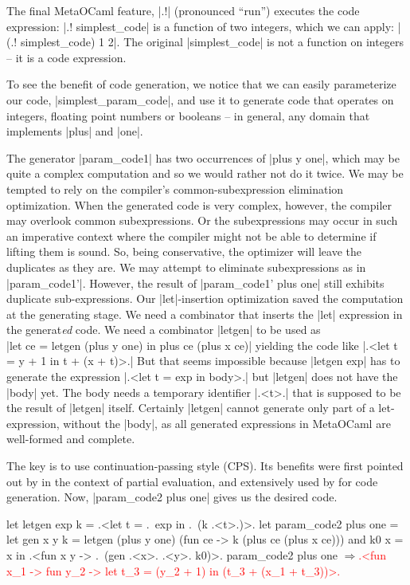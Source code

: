 \documentclass{llncs}
\newcommand{\evalresult}[1]{\ensuremath{\Longrightarrow}\textcolor{red}{#1}}
\begin{document}
The final MetaOCaml feature, |.!| (pronounced ``run'') 
executes the code expression: |.! simplest_code| is a function of two
integers, which we can apply: |(.! simplest_code) 1 2|. The original
|simplest_code| is not a function on integers -- it is a code
expression.

To see the benefit of code generation, we notice that we can easily
parameterize our code, |simplest_param_code|, and use it to generate
code that operates on integers, floating point numbers or booleans --
in general, any domain that implements |plus| and |one|.

The generator |param_code1| has two occurrences of |plus y one|,
which may be quite a complex computation and so we would rather not do
it twice. We may be tempted to rely on the compiler's
common-subexpression elimination optimization. When the generated code is
very complex, however, the compiler may overlook common subexpressions.  Or the
subexpressions may occur in such an imperative context where the compiler
might not be able to determine if lifting them is sound. So, being
conservative, the optimizer will leave the duplicates as they are. We
may attempt to eliminate subexpressions as in |param_code1'|. However,
the result of |param_code1' plus one| still exhibits duplicate
sub-expressions.  Our |let|-insertion optimization saved the
computation at the generating stage.  We need a combinator that
inserts the |let| expression in the generat\emph{ed} code. We need a
combinator |letgen| to be used as\\
|let ce = letgen (plus y one) in plus ce (plus x ce)|
yielding the code like |.<let t = y + 1 in t + (x + t)>.| 
But that seems impossible because |letgen exp| has to generate
the expression |.<let t = exp in body>.| but |letgen| does not
have the |body| yet. The body needs a temporary identifier |.<t>.|
that is supposed to be the result of |letgen| itself.  Certainly
|letgen| cannot generate only part of a let-expression, without the
|body|, as all generated expressions in MetaOCaml are well-formed and
complete.

The key is to use continuation-passing style (CPS). Its benefits were
first pointed out by \cite{Bondorf:92} in the context of partial
evaluation, and extensively used by \cite{MSP:PADL04,KiselyovTaha} for
code generation. Now, |param_code2 plus one| gives us the desired
code.

\begin{code}
let letgen exp k = .<let t = .~exp in .~(k .<t>.)>.
let param_code2 plus one =
  let gen x y k = letgen (plus y one) (fun ce -> k (plus ce (plus x ce)))
  and k0 x = x
  in .<fun x y -> .~(gen .<x>. .<y>. k0)>.
param_code2 plus one
\evalresult{.<fun x_1 -> fun y_2 -> let t_3 = (y_2 + 1) in (t_3 + (x_1 + t_3))>.}
\end{code}
\end{document}
